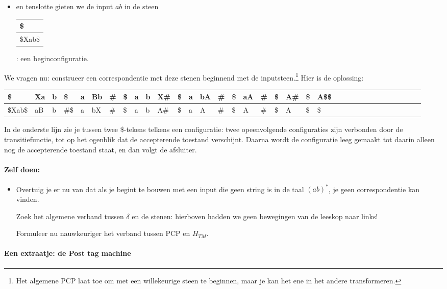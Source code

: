 \begin{itemize}
\item
en tenslotte gieten we de input $ab$ in de steen
\begin{tabular}{|l|}
\hline
\$ \\ \hline
\$Xab\$ \\ 
\hline
\end{tabular}
: een beginconfiguratie.
\end{itemize}

We vragen nu: construeer een correspondentie met deze stenen beginnend
met de inputsteen.\footnote{Het algemene PCP laat toe om met een
willekeurige steen te beginnen, maar je kan het ene in het andere
transformeren.} Hier is de oplossing:


{\footnotesize
\begin{tabular}{|l|l|l|l|l|l|l|l|l|l|l|l|l|l|l|l|l|l|l|l|l|l|l|l|l|l|l|l|l|l|l|l|l|l|}
\hline
\$      & Xa & b & \$   & a & Bb & \# & \$ & a & b & X\# & \$ &  a & bA & \# & \$ & aA & \# & \$ & A\# & \$ & A\$\$\\ \hline
\$Xab\$ & aB & b & \#\$ & a & bX & \# & \$ & a & b & A\# & \$ &  a &  A & \# & \$ & A  & \# & \$ & A   & \$ & \$  \\
\hline
\end{tabular}
}


In de onderste lijn zie je tussen twee \$-tekens telkens een
configuratie: twee opeenvolgende configuraties zijn verbonden door de
transitiefunctie, tot op het ogenblik dat de accepterende toestand
verschijnt. Daarna wordt de configuratie leeg gemaakt tot daarin alleen
nog de accepterende toestand staat, en dan volgt de afsluiter.


\paragraph{Zelf doen:}
\begin{itemize}
\item[]
Overtuig je er nu van dat als je begint te bouwen met een input die
geen string is in de taal $(ab)^*$, je geen correspondentie kan vinden.

Zoek het algemene verband tussen $\delta$ en de stenen: hierboven
hadden we geen bewegingen van de leeskop naar links!

Formuleer nu nauwkeuriger het verband tussen PCP en $H_{TM}$.
\end{itemize}



\paragraph{Een extraatje: de Post tag machine}

